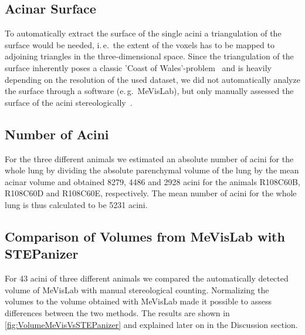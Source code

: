 \documentclass[%
	twoside,
	paper=a4,%
	abstract=true,%
	]{scrartcl}
\newcommand{\ie}{i.\,e.\ }
\newcommand{\eg}{e.\,g.\ }
\newcommand{\numberofacini}{43}
\begin{document}
\subsection{Acinar Surface}
To automatically extract the surface of the single acini a triangulation of the surface would be needed, \ie the extent of the voxels has to be mapped to adjoining triangles in the three-dimensional space. Since the triangulation of the surface inherently poses a classic 'Coast of Wales'-problem~\cite{Mandelbrot1967a} and is heavily depending on the resolution of the used dataset, we did not automatically analyze the surface through a software (\eg MeVisLab), but only manually assessed the surface of the acini stereologically~\cite{Hsia2010}.

\subsection{Number of Acini}

For the three different animals we estimated an absolute number of acini for the whole lung by dividing the absolute parenchymal volume of the lung by the mean acinar volume and obtained 8279, 4486 and 2928 acini for the animals R108C60B, R108C60D and R108C60E, respectively. The mean number of acini for the whole lung is thus calculated to be 5231 acini. 

\subsection{Comparison of Volumes from MeVisLab with STEPanizer}

For \numberofacini\xspace acini of three different animals we compared the automatically detected volume of MeVisLab with manual stereological counting. Normalizing the volumes to the volume obtained with MeVisLab made it possible to assess differences between the two methods. The results are shown in \autoref{fig:VolumeMeVisVsSTEPanizer} and explained later on in the Discussion section.
\end{document}
